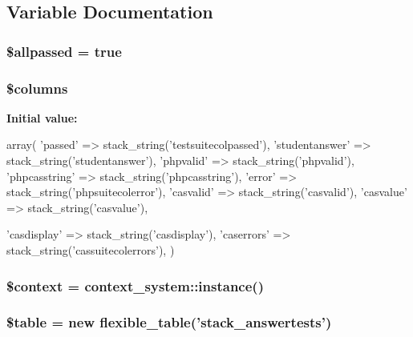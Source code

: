 \subsection{Variable Documentation}
\hypertarget{studentinputs_8php_ab5a10be91c162cb48ac439a779b80046}{
\subsubsection[{\$allpassed}]{\setlength{\rightskip}{0pt plus 5cm}\$allpassed = true}}
\label{studentinputs_8php_ab5a10be91c162cb48ac439a779b80046}
\hypertarget{studentinputs_8php_a19d2a3d21fe02053311fde465e6ae2e9}{
\subsubsection[{\$columns}]{\setlength{\rightskip}{0pt plus 5cm}\$columns}}
\label{studentinputs_8php_a19d2a3d21fe02053311fde465e6ae2e9}
{\bfseries Initial value:}
\begin{DoxyCode}
 array(
    'passed'             => stack_string('testsuitecolpassed'),
    'studentanswer'      => stack_string('studentanswer'),
    'phpvalid'           => stack_string('phpvalid'),
    'phpcasstring'       => stack_string('phpcasstring'),
    'error'              => stack_string('phpsuitecolerror'),
    'casvalid'           => stack_string('casvalid'),
    'casvalue'           => stack_string('casvalue'),
 
    'casdisplay'         => stack_string('casdisplay'),
    'caserrors'          => stack_string('cassuitecolerrors'),
)
\end{DoxyCode}
\hypertarget{studentinputs_8php_ae05dedb802ada0155efdece2044fed64}{
\subsubsection[{\$context}]{\setlength{\rightskip}{0pt plus 5cm}\$context = context\_\-system::instance()}}
\label{studentinputs_8php_ae05dedb802ada0155efdece2044fed64}
\hypertarget{studentinputs_8php_ae8876a14058f368335baccf35af4a22b}{
\subsubsection[{\$table}]{\setlength{\rightskip}{0pt plus 5cm}\$table = new flexible\_\-table('stack\_\-answertests')}}
